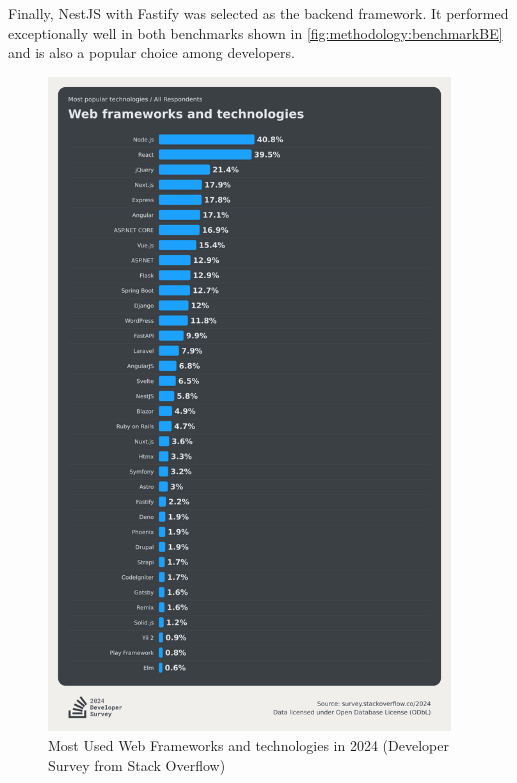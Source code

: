 Finally, NestJS \cite{methodology:nestjs} with Fastify was selected as the backend framework. It performed exceptionally well in both benchmarks shown in \autoref{fig:methodology:benchmarkBE} and is also a popular choice among developers.

\begin{figure}[htbp]
  \centering
  \includegraphics[width=0.95\textwidth]{gfx/figures/FrameworkSurvey2024.png}
  \caption{Most Used Web Frameworks and technologies in 2024 (Developer Survey from Stack Overflow) \cite{frontend:popularity}}
  \label{fig:methodology:popularFE}
\end{figure}
\clearpage

